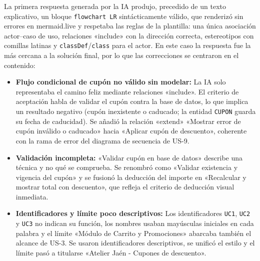 La primera respuesta generada por la IA produjo, precedido de un texto explicativo, un bloque \texttt{flowchart LR} sintácticamente válido, que renderizó sin errores en mermaid.live y respetaba las reglas de la plantilla: una única asociación actor--caso de uso, relaciones «include» con la dirección correcta, estereotipos con comillas latinas y \texttt{classDef}/\texttt{class} para el actor. En este caso la respuesta fue la más cercana a la solución final, por lo que las correcciones se centraron en el contenido:
\begin{itemize}[leftmargin=*,nosep]
\item \textbf{Flujo condicional de cupón no válido sin modelar:} La IA solo representaba el camino feliz mediante relaciones «include». El criterio de aceptación habla de validar el cupón contra la base de datos, lo que implica un resultado negativo (cupón inexistente o caducado; la entidad \texttt{CUPON} guarda su fecha de caducidad). Se añadió la relación «extend» «Mostrar error de cupón inválido o caducado» hacia «Aplicar cupón de descuento», coherente con la rama de error del diagrama de secuencia de US-9.
\item \textbf{Validación incompleta:} «Validar cupón en base de datos» describe una técnica y no qué se comprueba. Se renombró como «Validar existencia y vigencia del cupón» y se fusionó la deducción del importe en «Recalcular y mostrar total con descuento», que refleja el criterio de deducción visual inmediata.
\item \textbf{Identificadores y límite poco descriptivos:} Los identificadores \texttt{UC1}, \texttt{UC2} y \texttt{UC3} no indican su función, los nombres usaban mayúsculas iniciales en cada palabra y el límite «Módulo de Carrito y Promociones» abarcaba también el alcance de US-3. Se usaron identificadores descriptivos, se unificó el estilo y el límite pasó a titularse «Atelier Jaén - Cupones de descuento».
\end{itemize}

